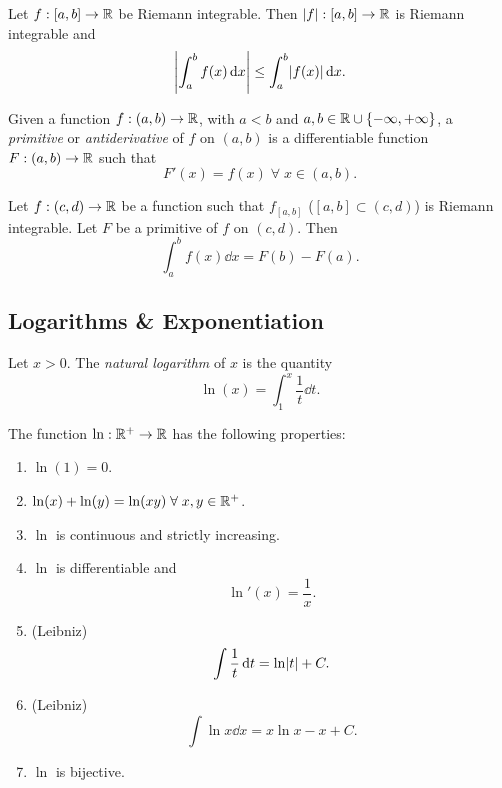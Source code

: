 \documentclass[12pt]{article}
\begin{document}
\begin{thm} \label{thm:integral triangle}
    Let $f : [a, b] \to \mathbb{R}$ be Riemann integrable. Then $\abs{f} : [a, b] \to \R$ is Riemann integrable and \[
        \abs{\int_{a}^{b} f(x) \dd x} \leq \int_{a}^{b} \abs{f(x)} \dd x.
    \]
\end{thm}

\begin{defn}[Primitive] \label{defn:primitive}
    Given a function $f : (a, b) \to \mathbb{R}$, with $a < b$ and $a, b \in \R \cup \set{-\infty, +\infty}$, a \emph{primitive} or \emph{antiderivative} of $f$ on $(a, b)$ is a differentiable function $F : (a, b) \to \mathbb{R}$ such that \[
        F'(x) = f(x) \;\forall\; x \in (a, b).
    \]
\end{defn}

\begin{thm} \label{thm:second ftoc}
    Let $f : (c, d) \to \mathbb{R}$ be a function such that $f_{[a, b]}$ ($[a, b] \subset (c, d)$) is Riemann integrable. Let $F$ be a primitive of $f$ on $(c, d)$. Then \[
        \int_{a}^{b} f(x) \dd x = F(b) - F(a).
    \]
\end{thm}

\subsection{Logarithms \& Exponentiation}

\begin{defn} \label{defn:ln}
    Let $x > 0$. The \emph{natural logarithm} of $x$ is the quantity \[
        \ln(x) = \int_{1}^{x} \frac{1}{t} \dd t.
    \]
\end{defn}

\begin{thm}[] \label{thm:}
    The function $\ln : \mathbb{R}^{+} \to \mathbb{R}$ has the following properties:
    \begin{enumerate}[label=(\alph*)]
        \item $\ln(1) = 0$.
        \item $\ln(x) + \ln(y) = \ln(xy) \;\forall\; x, y \in \mathbb{R}^{+}$.
        \item $\ln$ is continuous and strictly increasing.
        \item $\ln$ is differentiable and \[
            \ln'(x) = \frac{1}{x}.
        \]
        \item (Leibniz) \[
            \int \frac{1}{t} \dd t = \ln \abs{t} + C.
        \]
        \item (Leibniz) \[
            \int \ln x \dd x = x \ln x - x + C.
        \]
        \item $\ln$ is bijective.
    \end{enumerate}
\end{thm}
\end{document}
